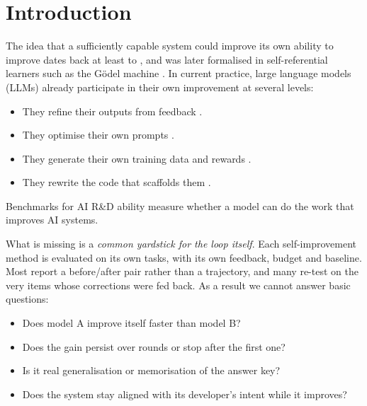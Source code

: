 \documentclass[11pt]{article}
\begin{document}
\section{Introduction}

The idea that a sufficiently capable system could improve its own ability to improve dates back at least to \citet{good1965}, and was later formalised in self-referential learners such as the G\"odel machine \citep{schmidhuber2003}. In current practice, large language models (LLMs) already participate in their own improvement at several levels:

\begin{itemize}
  \item They refine their outputs from feedback \citep{madaan2023selfrefine, shinn2023reflexion}.
  \item They optimise their own prompts \citep{yang2023opro, fernando2023promptbreeder, khattab2023dspy, yuksekgonul2024textgrad}.
  \item They generate their own training data and rewards \citep{zelikman2022star, yuan2024selfrewarding}.
  \item They rewrite the code that scaffolds them \citep{zelikman2023stop, yin2024godelagent, zhang2025dgm}.
\end{itemize}

Benchmarks for AI R\&D ability \citep{chan2024mlebench, wijk2024rebench} measure whether a model can do the work that improves AI systems.

What is missing is a \emph{common yardstick for the loop itself}. Each self-improvement method is evaluated on its own tasks, with its own feedback, budget and baseline. Most report a before/after pair rather than a trajectory, and many re-test on the very items whose corrections were fed back. As a result we cannot answer basic questions:

\begin{itemize}
  \item Does model A improve itself faster than model B?
  \item Does the gain persist over rounds or stop after the first one?
  \item Is it real generalisation or memorisation of the answer key?
  \item Does the system stay aligned with its developer's intent while it improves?
\end{itemize}
\end{document}
